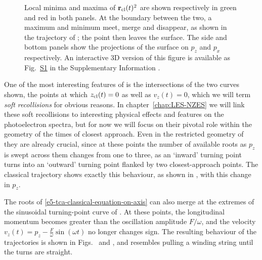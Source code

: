\begin{figure}[t!h]
{  Local minima and maxima of $\vb{r}_{\mathrm{cl}}(t)^2$ are shown respectively in green and red in both panels. At the boundary between the two, a maximum and minimum meet, merge and disappear, as shown in the trajectory of ; the point then leaves the surface.
  The side  and bottom panels show the projections of the surface on $p_z$ and $p_x$ respectively. 
  An interactive 3D version of this figure is available as Fig.~\href{https://electrondynamicsincomplextimeandspace.github.io/\#figure-s1}{S1} in the Supplementary Information \cite{SupplementaryInformation}.
 }
  \label{f5-classical-tca-plots}
\end{figure}

One of the most interesting features of  is the intersections of the two curves shown, the points at which $z_{\mathrm{cl}}(t)=0$ as well as $v_z(t)=0$, which we will term \textit{soft recollisions} for obvious reasons. In chapter~\ref{chap:LES-NZES} we will link these soft recollisions to interesting physical effects and features on the photoelectron spectra, but for now we will focus on their pivotal role within the geometry of the times of closest approach. Even in the restricted geometry of  they are already crucial, since at these points the number of available roots as $p_z$ is swept across them changes from one to three, as an `inward' turning point turns into an `outward' turning point flanked by two closest-approach points. The classical trajectory shows exactly this behaviour, as shown in , with this change in $p_z$.

The roots of \eqref{e5-tca-classical-equation-on-axis} can also merge at the extremes of the sinusoidal turning-point curve of . At these points, the longitudinal momentum becomes greater than the oscillation amplitude $F/\omega$, and the velocity $v_z(t)=p_z - \frac{F}{\omega}\sin(\omega t)$ no longer changes sign. The resulting behaviour of the trajectories is shown in Figs.~ and , and resembles pulling a winding string until the turns are straight.


